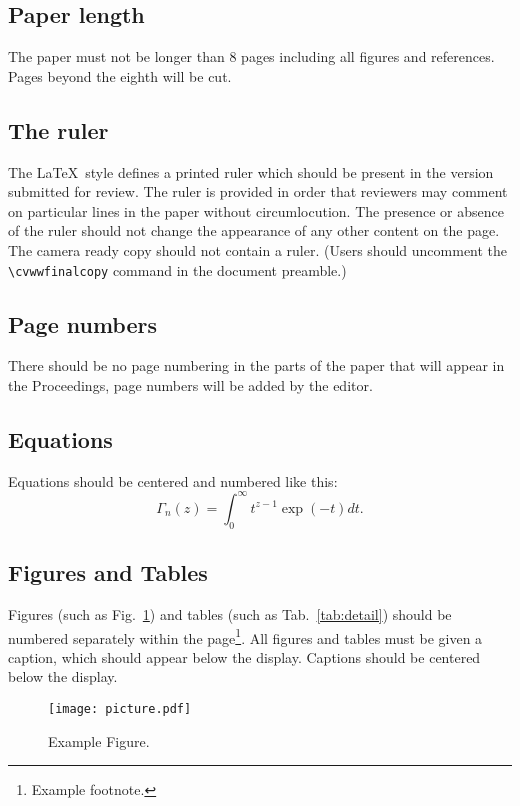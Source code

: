 \documentclass[11pt,twoside,twocolumn,a4paper]{article}
\begin{document}
\subsection{Paper length}
The paper must not be longer than 8 pages including all figures and references. Pages beyond the eighth will be cut.

\subsection{The ruler}
The \LaTeX\ style defines a printed ruler which should be present in the version submitted for review. The ruler is provided in order that
reviewers may comment on particular lines in the paper without circumlocution. The presence or absence of the ruler
should not change the appearance of any other content on the page.  The camera ready copy should not contain a ruler. (Users should uncomment
the \verb'\cvwwfinalcopy' command in the document preamble.) 

\subsection{Page numbers}
There should be no page numbering in the parts of the paper that will
appear in the Proceedings, page numbers will be added by the editor.

\subsection{Equations}
Equations should be centered and numbered like this:
\begin{equation}
\Gamma_n(z) = \int_0^\infty t^{z-1} \exp(-t) dt.
\end{equation}

\subsection{Figures and Tables}
Figures (such as Fig.~\ref{fig:total}) and tables (such as Tab.~\ref{tab:detail})
should be numbered separately within the page\footnote{Example footnote.}.  All
figures and tables must be given a caption, which should appear below
the display. Captions should be centered below the display.

\begin{figure}[htbp]
    \centering
    \texttt{[image: picture.pdf]}
    \caption{Example Figure.}
    \label{fig:total}
\end{figure}
\end{document}
